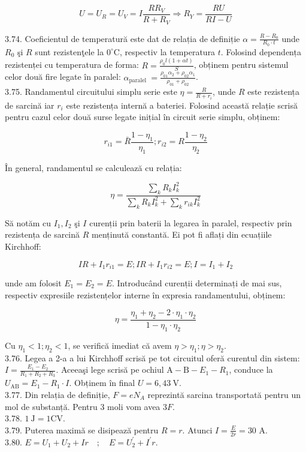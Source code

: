 \documentclass[10pt]{article}
\begin{document}
$$
U=U_{R}=U_{V}=I \frac{R R_{V}}{R+R_{V}} \Rightarrow R_{Y}=\frac{R U}{R I-U}
$$

3.74. Coeficientul de temperatură este dat de relația de definiție $\alpha=\frac{R-R_{0}}{R_{0} \cdot t}$ unde $R_{0}$ şi $R$ sunt rezistenţele la $0^{\circ} \mathrm{C}$, respectiv la temperatura $t$. Folosind dependența rezistenței cu temperatura de forma: $R=\frac{\rho_{0} l(1+\alpha t)}{S}$, obținem pentru sistemul celor două fire legate în paralel: $\alpha_{\text {paralel }}=\frac{\rho_{01} \alpha_{2}+\rho_{02} \alpha_{1}}{\rho_{01}+\rho_{02}}$.\\
3.75. Randamentul circuitului simplu serie este $\eta=\frac{R}{R+r_{i}}$, unde $R$ este rezistența de sarcină iar $r_{i}$ este rezistența internă a bateriei. Folosind această relație scrisă pentru cazul celor două surse legate inițial în circuit serie simplu, obținem:

$$
r_{i 1}=\bar{R} \frac{1-\eta_{1}}{\eta_{1}} ; r_{i 2}=R \frac{1-\eta_{2}}{\eta_{2}}
$$

În general, randamentul se calculează cu relația:

$$
\eta=\frac{\sum_{k} R_{k} I_{k}^{2}}{\sum_{k} R_{k} I_{k}^{2}+\sum_{k} r_{i k} I_{k}^{2}}
$$

Să notăm cu $I_{1}, I_{2}$ şi $I$ curenții prin baterii la legarea în paralel, respectiv prin rezistența de sarcină $R$ menținută constantă. Ei pot fi aflați din ecuațiile Kirchhoff:

$$
I R+I_{1} r_{i 1}=E ; I R+I_{1} r_{i 2}=E ; I=I_{1}+I_{2}
$$

unde am folosit $E_{1}=E_{2}=E$. Introducând curenții determinați de mai sus, respectiv expresiile rezistențelor interne în expresia randamentului, obținem:

$$
\eta=\frac{\eta_{1}+\eta_{2}-2 \cdot \eta_{1} \cdot \eta_{2}}{1-\eta_{1} \cdot \eta_{2}}
$$

Cu $\eta_{1}<1 ; \eta_{2}<1$, se verifică imediat că avem $\eta>\eta_{1} ; \eta>\eta_{2}$.\\
3.76. Legea a 2-a a lui Kirchhoff scrisă pe tot circuitul oferă curentul din sistem: $I=\frac{E_{1}-E_{2}}{R_{1}+R_{2}+R_{3}}$. Aceeaşi lege scrisă pe ochiul $\mathrm{A}-\mathrm{B}-E_{1}-R_{1}$, conduce la $U_{\mathrm{AB}}=E_{1}-R_{1} \cdot I$. Obținem în final $U=6,43 \mathrm{~V}$.\\
3.77. Din relația de definiție, $F=e N_{A}$ reprezintă sarcina transportată pentru un mol de substanță. Pentru 3 moli vom avea $3 F$.\\
3.78. $1 \mathrm{~J}=1 \mathrm{CV}$.\\
3.79. Puterea maximă se disipează pentru $R=r$. Atunci $I=\frac{E}{2 r}=30$ A.\\
3.80. $E=U_{1}+U_{2}+I r \quad ; \quad E=U_{2}^{\prime}+I^{\prime} r$.
\end{document}
